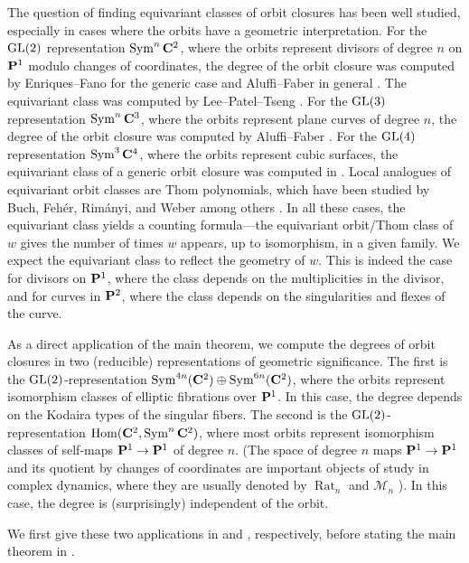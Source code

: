 \documentclass{amsart}
\begin{document}
The question of finding equivariant classes of orbit closures has been well studied, especially in cases where the orbits have a geometric interpretation.
For the \(\GL(2)\) representation \(\Sym^n \C^2\), where the orbits represent divisors of degree \(n\) on \(\P^1\) modulo changes of coordinates, the degree of the orbit closure was computed by Enriques--Fano \cite{enr.fan:98} for the generic case and Aluffi--Faber in general \cite{alu.fab:93*1}.
The equivariant class was computed by Lee--Patel--Tseng \cite[Appendix~B]{lee.pat.tse:23}.
For the \(\GL(3)\) representation \(\Sym^n \C^3\), where the orbits represent plane curves of degree \(n\), the degree of the orbit closure was computed by Aluffi--Faber \cite{alu.fab:00,alu.fab:93}.
For the \(\GL(4)\) representation \(\Sym^3 \C^4\), where the orbits represent cubic surfaces, the equivariant class of a generic orbit closure was computed in \cite{deo.pat.tse:21}.
Local analogues of equivariant orbit classes are Thom polynomials, which have been studied by Buch, Fehér, Rimányi, and Weber among others \cite{feh.rim.web:20,feh.rim:12,rim:01}.
In all these cases, the equivariant class yields a counting formula---the equivariant orbit/Thom class of \(w\) gives the number of times \(w\) appears, up to isomorphism, in a given family.
We expect the equivariant class to reflect the geometry of \(w\).
This is indeed the case for divisors on \(\P^1\), where the class depends on the multiplicities in the divisor, and for curves in \(\P^2\), where the class depends on the singularities and flexes of the curve.

As a direct application of the main theorem, we compute the degrees of orbit closures in two (reducible) representations of geometric significance.
The first is the \(\GL(2)\)-representation \(\Sym^{4n}(\C^2) \oplus \Sym^{6n}(\C^2)\), where the orbits represent isomorphism classes of elliptic fibrations over \(\P^1\).
In this case, the degree depends on the Kodaira types of the singular fibers.
The second is the \(\GL(2)\)-representation \(\Hom(\C^2, \Sym^n\C^2)\), where most orbits represent isomorphism classes of self-maps \(\P^1 \to \P^1\) of degree \(n\).
(The space of degree \(n\) maps \(\P^1 \to \P^1\) and its quotient by changes of coordinates are important objects of study in complex dynamics, where they are usually denoted by \(\operatorname{Rat}_n\) and \(\mathcal M_n\) \cite{ree:92,seg:79,mil:93,sil:98}).
In this case, the degree is (surprisingly) independent of the orbit.

We first give these two applications in  and , respectively, before stating the main theorem in .
\end{document}
